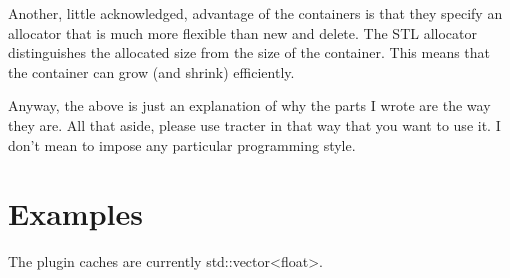 Another, little acknowledged, advantage of the containers is that they
specify an allocator that is much more flexible than new and delete.
The STL allocator distinguishes the allocated size from the size of
the container.  This means that the container can grow (and shrink)
efficiently.

Anyway, the above is just an explanation of why the parts I wrote are
the way they are.  All that aside, please use tracter in that way that
you want to use it.  I don't mean to impose any particular programming
style.

\section{Examples}

The plugin caches are currently std::vector<float>.


